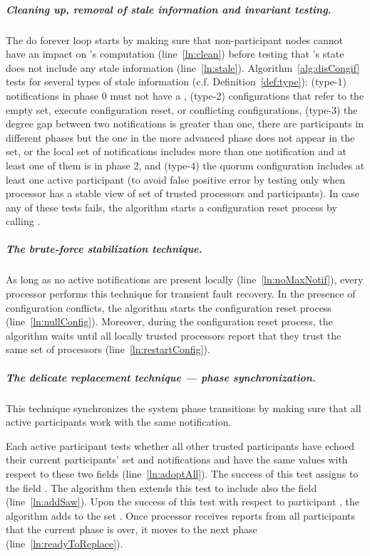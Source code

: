 \documentclass[11pt]{article}
\begin{document}
\subparagraph{Cleaning up, removal of stale information and invariant testing.} The do forever loop starts by making sure that non-participant nodes cannot have an impact on 's computation (line~\ref{ln:clean}) before testing that 's state does not include any stale information (line~\ref{ln:stale}). Algorithm~\ref{alg:disCongif} tests for several types of stale information (c.f. Definition~\ref{def:type}): (type-1) notifications in phase 0 must not have a , (type-2) configurations that refer to the empty set, execute configuration reset, or conflicting  configurations, (type-3) the degree gap between two notifications is greater than one, there are participants in different  phases but the one in the more advanced phase does not appear in the  set, or the local set of notifications includes more than one notification and at least one of them is in phase 2, and (type-4)
the quorum configuration includes at least one active participant (to avoid false positive error by testing only when processor  has a stable view of set of trusted processors and participants). In case any of these tests fails, the algorithm starts a configuration reset process by calling .

\subparagraph{The brute-force stabilization technique.}
As long as no active notifications are present locally (line~\ref{ln:noMaxNotif}), every processor performs this technique for transient fault recovery. In the presence of configuration conflicts, the algorithm starts the configuration reset process (line~\ref{ln:nullConfig}). Moreover, during the configuration reset process, the algorithm waits until all locally trusted processors report that they trust the same set of processors (line~\ref{ln:restartConfig}).



\subparagraph{The delicate replacement technique --- phase synchronization.}
This technique synchronizes the system phase transitions by making sure that all active participants work with the same notification.

Each active participant tests whether all other trusted participants have echoed their current participants' set and notifications and have the same values with respect to these two fields     
(line~\ref{ln:adoptAll}). The success of this test assigns  to the field . The algorithm then extends this test to include also the field  (line~\ref{ln:addSaw}). Upon the success of this test with respect to participant , the algorithm adds  to the set .
Once processor  receives reports from all participants that the current phase is over, it moves to the next phase (line~\ref{ln:readyToReplace}).
\end{document}
